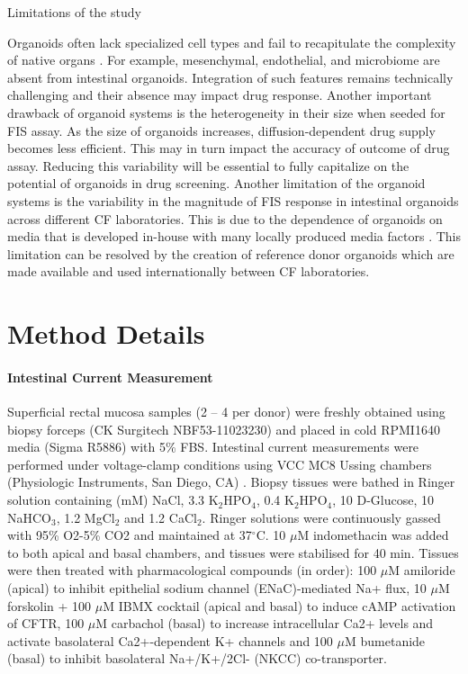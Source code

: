 Limitations of the study

Organoids often lack specialized cell types and fail to recapitulate the complexity of native organs \cite{clevers2016}. For example, mesenchymal, endothelial, and microbiome are absent from intestinal organoids. Integration of such features remains technically challenging and their absence may impact drug response. Another important drawback of organoid systems is the heterogeneity in their size when seeded for FIS assay. As the size of organoids increases, diffusion-dependent drug supply becomes less efficient. This may in turn impact the accuracy of outcome of drug assay. Reducing this variability will be essential to fully capitalize on the potential of organoids in drug screening. Another limitation of the organoid systems is the variability in the magnitude of FIS response in intestinal organoids across different CF laboratories. This is due to the dependence of organoids on media that is developed in-house with many locally produced media factors \cite{dekkers2016,ramalho2021}. This limitation can be resolved by the creation of reference donor organoids which are made available and used internationally between CF laboratories.

\section{Method Details}
\paragraph{Intestinal Current Measurement} Superficial rectal mucosa samples (2 – 4 per donor) were freshly obtained using biopsy forceps (CK Surgitech NBF53-11023230) and placed in cold RPMI1640 media (Sigma R5886) with 5\% FBS. Intestinal current measurements were performed under voltage-clamp conditions using VCC MC8 Ussing chambers (Physiologic Instruments, San Diego, CA) \cite{dejonge2004, derichs2010, li2004}. Biopsy tissues were bathed in Ringer solution containing (mM) NaCl, 3.3 K$_2$HPO$_4$, 0.4 K$_2$HPO$_4$, 10 D-Glucose, 10 NaHCO$_3$, 1.2 MgCl$_2$ and 1.2 CaCl$_2$. Ringer solutions were continuously gassed with 95\% O2-5\% CO2 and maintained at 37$^\circ$C. 10 $\mu$M indomethacin was added to both apical and basal chambers, and tissues were stabilised for 40 min. Tissues were then treated with pharmacological compounds (in order): 100 $\mu$M amiloride (apical) to inhibit epithelial sodium channel (ENaC)-mediated Na+ flux, 10 $\mu$M forskolin + 100 $\mu$M IBMX cocktail (apical and basal) to induce cAMP activation of CFTR, 100 $\mu$M carbachol (basal) to increase intracellular Ca2+ levels and activate basolateral Ca2+-dependent K+ channels and 100 $\mu$M bumetanide (basal) to inhibit basolateral Na+/K+/2Cl- (NKCC) co-transporter.

